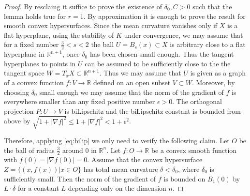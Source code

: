 \documentclass[12pt,leqno]{amsart}
\numberwithin{equation}{section}
\theoremstyle{definition}
\theoremstyle{remark}
\newcommand{\R}{\mathbb{R}}
\begin{document}
\begin{proof}
By resclaing it suffice to prove the existence of $\delta _0, C>0$ such that the lemma holds true for $r=1$.
By approximation it is enough to prove the result for smooth convex hypersurfaces.  Since the mean curvature vanishes only
if $X$ is a flat hyperplane, using the stability of $K$ under convergence, we may assume that  for a fixed number $\frac 3 2<s<2$ the ball $U=B_{s} (x) \subset X$ is arbitrary close
to a flat hyperplane in $\R^{n+1}$, once $\delta _0$ has been chosen small enough.  Thus the tangent hyperplanes  to points in $U$  can be assumed to be sufficiently close to the the tangent
space  $W =T_xX \subset \R^{n+1}$. Thus we may assume that $U$ is given as a graph  of a convex function $f:V\to \R$ defined on an open subset $V\subset W$.
Moreover, by choosing $\delta _0$ small enough we may assume
that the norm of the  gradient of $f$ is everywhere smaller than any fixed positive number $\epsilon >0$.
The orthogonal projection $P:U \to V$ is biLipschitz and the biLipschitz constant is bounded from above by $\sqrt {1+ |\nabla f|^2} \leq 1+ |\nabla f| ^2 <1+\epsilon ^2$.

Therefore, applying \eqref{eq:bilip} we only need to verify the following claim.  Let $O$ be the ball of radius $\frac 3 2$ around $0$ in $\R^n$. Let $f:O\to \R$ be a convex  smooth function
with $f(0)=|\nabla f (0)|=0$. Assume that the convex hypersurface $Z= \{(x,f(x)) | x\in O \}$ has total mean curvature $\delta <\delta _0$, where $\delta _0$ is sufficiently small.
Then the norm of the gradient of $f$ is bounded on $B_1 (0)$ by $L\cdot \delta$ for a constant $L$ depending only on the dimension $n$.
\end{proof}
\end{document}
